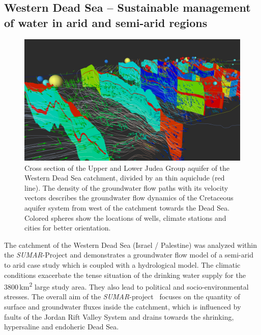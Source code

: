 \documentclass[twocolumn]{svjour3}          %
\begin{document}
\subsection{Western Dead Sea -- Sustainable management of water in arid and semi-arid regions}
\label{western-dead-sea---sustainable-management-of-water-in-arid-and-semi-arid-regions}

\begin{figure}[htb]
  \includegraphics[width=\linewidth]{images/deadsea.jpg}
\caption{Cross section of the Upper and Lower Judea Group aquifer of the Western Dead Sea catchment, divided by an thin aquiclude (red line). The density of the groundwater flow paths with its velocity vectors describes the groundwater flow dynamics of the Cretaceous aquifer system from west of the catchment towards the Dead Sea. Colored spheres show the locations of wells, climate stations and cities for better orientation.}
\label{fig:deadsea}
\end{figure}

The catchment of the Western Dead Sea (Israel / Palestine) was analyzed within the \emph{SUMAR}-Project and de\-mon\-strates a groundwater flow model of a semi-arid to arid case study which is coupled with a hydrological model. The climatic conditions exacerbate the tense situation of the drinking water supply for the 3800\,km\textsuperscript{2} large study area. They also lead to political and socio-environmental stresses. The overall aim of the \emph{SU\-MAR}-project~\cite{Siebert:2014} focuses on the quantity of surface and groundwater fluxes inside the catchment, which is influenced by faults of the Jordan Rift Valley System and drains towards the shrinking, hypersaline and endoheric Dead Sea.
\end{document}
